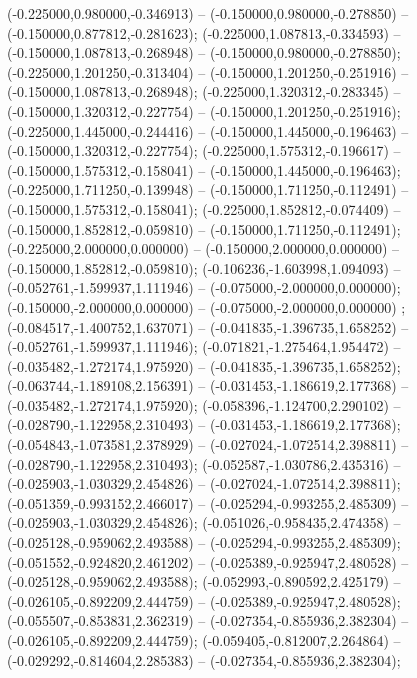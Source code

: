  (-0.225000,0.980000,-0.346913) -- (-0.150000,0.980000,-0.278850) -- (-0.150000,0.877812,-0.281623);
 (-0.225000,1.087813,-0.334593) -- (-0.150000,1.087813,-0.268948) -- (-0.150000,0.980000,-0.278850);
 (-0.225000,1.201250,-0.313404) -- (-0.150000,1.201250,-0.251916) -- (-0.150000,1.087813,-0.268948);
 (-0.225000,1.320312,-0.283345) -- (-0.150000,1.320312,-0.227754) -- (-0.150000,1.201250,-0.251916);
 (-0.225000,1.445000,-0.244416) -- (-0.150000,1.445000,-0.196463) -- (-0.150000,1.320312,-0.227754);
 (-0.225000,1.575312,-0.196617) -- (-0.150000,1.575312,-0.158041) -- (-0.150000,1.445000,-0.196463);
 (-0.225000,1.711250,-0.139948) -- (-0.150000,1.711250,-0.112491) -- (-0.150000,1.575312,-0.158041);
 (-0.225000,1.852812,-0.074409) -- (-0.150000,1.852812,-0.059810) -- (-0.150000,1.711250,-0.112491);
 (-0.225000,2.000000,0.000000) -- (-0.150000,2.000000,0.000000) -- (-0.150000,1.852812,-0.059810);
 (-0.106236,-1.603998,1.094093) -- (-0.052761,-1.599937,1.111946) -- (-0.075000,-2.000000,0.000000);
 (-0.150000,-2.000000,0.000000) -- (-0.075000,-2.000000,0.000000) ;
 (-0.084517,-1.400752,1.637071) -- (-0.041835,-1.396735,1.658252) -- (-0.052761,-1.599937,1.111946);
 (-0.071821,-1.275464,1.954472) -- (-0.035482,-1.272174,1.975920) -- (-0.041835,-1.396735,1.658252);
 (-0.063744,-1.189108,2.156391) -- (-0.031453,-1.186619,2.177368) -- (-0.035482,-1.272174,1.975920);
 (-0.058396,-1.124700,2.290102) -- (-0.028790,-1.122958,2.310493) -- (-0.031453,-1.186619,2.177368);
 (-0.054843,-1.073581,2.378929) -- (-0.027024,-1.072514,2.398811) -- (-0.028790,-1.122958,2.310493);
 (-0.052587,-1.030786,2.435316) -- (-0.025903,-1.030329,2.454826) -- (-0.027024,-1.072514,2.398811);
 (-0.051359,-0.993152,2.466017) -- (-0.025294,-0.993255,2.485309) -- (-0.025903,-1.030329,2.454826);
 (-0.051026,-0.958435,2.474358) -- (-0.025128,-0.959062,2.493588) -- (-0.025294,-0.993255,2.485309);
 (-0.051552,-0.924820,2.461202) -- (-0.025389,-0.925947,2.480528) -- (-0.025128,-0.959062,2.493588);
 (-0.052993,-0.890592,2.425179) -- (-0.026105,-0.892209,2.444759) -- (-0.025389,-0.925947,2.480528);
 (-0.055507,-0.853831,2.362319) -- (-0.027354,-0.855936,2.382304) -- (-0.026105,-0.892209,2.444759);
 (-0.059405,-0.812007,2.264864) -- (-0.029292,-0.814604,2.285383) -- (-0.027354,-0.855936,2.382304);
